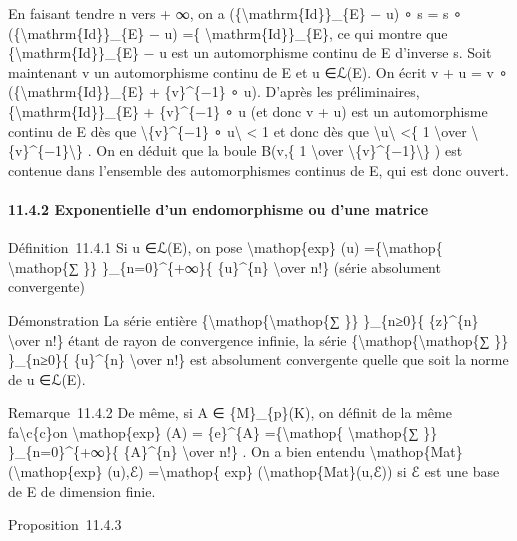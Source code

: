\documentclass[]{article}
\begin{document}
En faisant tendre n vers + ∞, on a
(\{\textbackslash{}mathrm\{Id\}\}\_\{E\} − u) ∘ s = s ∘
(\{\textbackslash{}mathrm\{Id\}\}\_\{E\} − u) =\{
\textbackslash{}mathrm\{Id\}\}\_\{E\}, ce qui montre que
\{\textbackslash{}mathrm\{Id\}\}\_\{E\} − u est un automorphisme continu
de E d'inverse s. Soit maintenant v un automorphisme continu de E et u
∈ℒ(E). On écrit v + u = v ∘ (\{\textbackslash{}mathrm\{Id\}\}\_\{E\} +
\{v\}\^{}\{−1\} ∘ u). D'après les préliminaires,
\{\textbackslash{}mathrm\{Id\}\}\_\{E\} + \{v\}\^{}\{−1\} ∘ u (et donc v
+ u) est un automorphisme continu de E dès que
\textbackslash{}\textbar{}\{v\}\^{}\{−1\} ∘ u\textbackslash{}\textbar{}
\textless{} 1 et donc dès que
\textbackslash{}\textbar{}u\textbackslash{}\textbar{} \textless{}\{ 1
\textbackslash{}over
\textbackslash{}\textbar{}\{v\}\^{}\{−1\}\textbackslash{}\textbar{}\} .
On en déduit que la boule B(v,\{ 1 \textbackslash{}over
\textbackslash{}\textbar{}\{v\}\^{}\{−1\}\textbackslash{}\textbar{}\} )
est contenue dans l'ensemble des automorphismes continus de E, qui est
donc ouvert.

\paragraph{11.4.2 Exponentielle d'un endomorphisme ou d'une matrice}

Définition~11.4.1 Si u ∈ℒ(E), on pose \textbackslash{}mathop\{exp\} (u)
=\{\textbackslash{}mathop\{ \textbackslash{}mathop\{∑ \}\}
\}\_\{n=0\}\^{}\{+∞\}\{ \{u\}\^{}\{n\} \textbackslash{}over n!\} (série
absolument convergente)

Démonstration La série entière
\{\textbackslash{}mathop\{\textbackslash{}mathop\{∑ \}\} \}\_\{n≥0\}\{
\{z\}\^{}\{n\} \textbackslash{}over n!\} étant de rayon de convergence
infinie, la série \{\textbackslash{}mathop\{\textbackslash{}mathop\{∑
\}\} \}\_\{n≥0\}\{ \{u\}\^{}\{n\} \textbackslash{}over n!\} est
absolument convergente quelle que soit la norme de u ∈ℒ(E).

Remarque~11.4.2 De même, si A ∈ \{M\}\_\{p\}(K), on définit de la même
fa\textbackslash{}c\{c\}on \textbackslash{}mathop\{exp\} (A) =
\{e\}\^{}\{A\} =\{\textbackslash{}mathop\{ \textbackslash{}mathop\{∑
\}\} \}\_\{n=0\}\^{}\{+∞\}\{ \{A\}\^{}\{n\} \textbackslash{}over n!\} .
On a bien entendu
\textbackslash{}mathop\{Mat\}(\textbackslash{}mathop\{exp\} (u),ℰ)
=\textbackslash{}mathop\{ exp\} (\textbackslash{}mathop\{Mat\}(u,ℰ)) si
ℰ est une base de E de dimension finie.

Proposition~11.4.3
\end{document}
